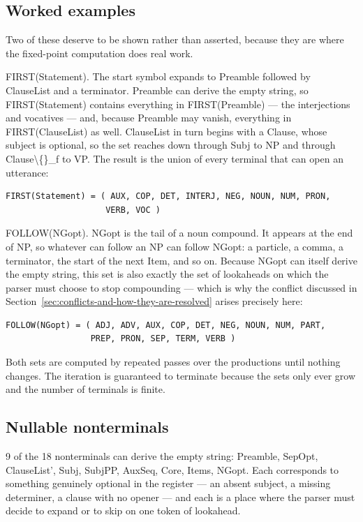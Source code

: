 \documentclass[11pt,a4paper]{article}
\newcommand{\vbfmt}{\color{ink!88}}
\begin{document}
\subsection{Worked examples}
Two of these deserve to be shown rather than asserted, because they are where the fixed-point computation does real work.

FIRST(Statement). The start symbol expands to Preamble followed by ClauseList and a terminator. Preamble can derive the empty string, so FIRST(Statement) contains everything in FIRST(Preamble) --- the interjections and vocatives --- and, because Preamble may vanish, everything in FIRST(ClauseList) as well. ClauseList in turn begins with a Clause, whose subject is optional, so the set reaches down through Subj to NP and through Clause\textbackslash\{\}\_f to VP. The result is the union of every terminal that can open an utterance:

\begin{Verbatim}[commandchars=\\\{\},fontsize=\small,formatcom=\vbfmt,frame=leftline,framerule=1.2pt,rulecolor=\color{clay!55},framesep=6pt,xleftmargin=10pt,xrightmargin=4pt]
FIRST(Statement) = ( AUX, COP, DET, INTERJ, NEG, NOUN, NUM, PRON,
                    VERB, VOC )
\end{Verbatim}
FOLLOW(NGopt). NGopt is the tail of a noun compound. It appears at the end of NP, so whatever can follow an NP can follow NGopt: a particle, a comma, a terminator, the start of the next Item, and so on. Because NGopt can itself derive the empty string, this set is also exactly the set of lookaheads on which the parser must choose to stop compounding --- which is why the conflict discussed in Section~\ref{sec:conflicts-and-how-they-are-resolved} arises precisely here:

\begin{Verbatim}[commandchars=\\\{\},fontsize=\small,formatcom=\vbfmt,frame=leftline,framerule=1.2pt,rulecolor=\color{clay!55},framesep=6pt,xleftmargin=10pt,xrightmargin=4pt]
FOLLOW(NGopt) = ( ADJ, ADV, AUX, COP, DET, NEG, NOUN, NUM, PART,
                 PREP, PRON, SEP, TERM, VERB )
\end{Verbatim}
Both sets are computed by repeated passes over the productions until nothing changes. The iteration is guaranteed to terminate because the sets only ever grow and the number of terminals is finite.

\subsection{Nullable nonterminals}
9 of the 18 nonterminals can derive the empty string: Preamble, SepOpt, ClauseList', Subj, SubjPP, AuxSeq, Core, Items, NGopt. Each corresponds to something genuinely optional in the register --- an absent subject, a missing determiner, a clause with no opener --- and each is a place where the parser must decide to expand or to skip on one token of lookahead.
\end{document}
